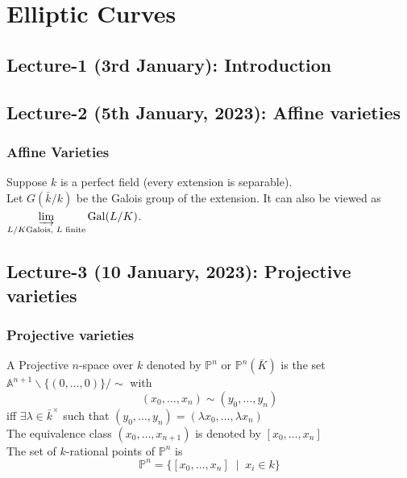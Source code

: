 \documentclass[oneside, 12pt, ]{scrbook}
\theoremstyle{theorem}
\begin{document}
\part{Elliptic Curves}

\chapter{Lecture-1 (3rd January): Introduction }

\chapter{Lecture-2 (5th January, 2023): Affine varieties }

\section{Affine Varieties}

Suppose $k$ is a perfect field (every extension is separable). \\
Let $G(\bar{k}/k)$ be the Galois group of the extension. It can also be viewed as $\displaystyle{\varinjlim_{L/K \text{Galois, }L \text{ finite}} \mathrm{Gal}(L/K)}$. \\



\chapter{Lecture-3 (10 January, 2023): Projective varieties}

\section{Projective varieties}

\begin{definition}
A Projective $n$-space over $k$ denoted by $\mathbb{P}^n$ or $\mathbb{P}^{n}(\bar{K})$ is the set $\mathbb{A}^{n+1} \backslash \{(0,\hdots , 0)\} / \sim$ with  
$$(x_{0}, \hdots ,x_{n}) \sim (y_{0},\hdots ,y_{n})$$ iff $\exists \lambda \in \bar{k}^{\times}$ such that $(y_{0},\hdots ,y_{n}) = (\lambda x_{0},\hdots ,\lambda x_{n})$\\
The equivalence class $(x_{0},\hdots ,x_{n+1})$ is denoted by $[x_{0},\hdots ,x_{n}]$\\
The set of $k$-rational points of $\mathbb{P}^n$ is $$\mathbb{P}^n = \{[x_{0}, \hdots , x_{n}]\; \mid \; x_{i} \in k\}$$
\end{definition}
\end{document}
